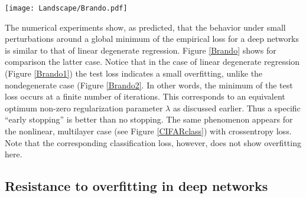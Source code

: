 \documentclass[10pt]{article}
\begin{document}
\begin{figure*}[h!]\centering
\texttt{[image: Landscape/Brando.pdf]}
\caption{\it Training and testing with the square loss for a linear
  network in the feature space (i.e. $y=W\Phi(X)$) with a degenerate
  Hessian of the type of Figure \ref{degeneratesquareloss}.  The
  feature matrix $\phi(X)$ is wrt a polynomial with degree 30.  The
  target function is a sine function $f(x) = sin(2 \pi f x) $ with
  frequency $f=4$ on the interval $[-1,1]$.  The number of training
  points are $9$ while the number of test points are $100$.  The
  training was done with full gradient descent with step size $0.2$
  for $250,000$ iterations.  Weights were perturbed every $4000$
  iterations and then gradient descent was allowed to converge to zero
  training error after each perturbation.  The weights were perturbed
  by addition of Gaussian noise with mean $0$ and standard deviation $0.6$.
  The $L_2$ norm of the weights is shown on the right.  Note that
  training was repeated 30 times. The figure reports the average train
  and test error as well as average norm of the weights over the 30
  repetitions. Figure \ref{Brando1} shows the same situation
  without perturbations.}
\label{Brando}
\end{figure*}



The numerical experiments show, as predicted, that the behavior under
small perturbations around a global minimum of the empirical loss for
a deep networks is similar to that of linear degenerate
regression. Figure \ref{Brando} shows for comparison the latter
case. Notice that in the case of linear degenerate regression (Figure
\ref{Brando1}) the test loss indicates a small overfitting, unlike the
nondegenerate case (Figure \ref{Brando2}. In other words, the minimum
of the test loss occurs at a finite number of iterations. This
corresponds to an equivalent optimum non-zero regularization parameter
$\lambda$ as discussed earlier. Thus a specific ``early stopping'' is
better than no stopping.  The same phenomenon appears for the
nonlinear, multilayer case (see Figure \ref{CIFARclass}) with
crossentropy loss. Note that the corresponding classification loss,
however, does not show overfitting here. 



\subsection{Resistance to  overfitting in deep networks}
\end{document}
